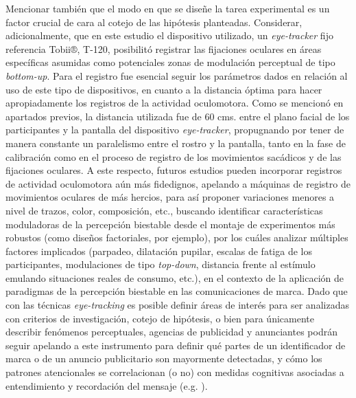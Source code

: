 \documentclass[spanish]{textolivre}
\begin{document}
Mencionar también que el modo en que se diseñe la tarea experimental es un factor crucial de cara al cotejo de las hipótesis planteadas. Considerar, adicionalmente, que en este estudio el dispositivo utilizado, un \textit{eye-tracker} fijo referencia Tobii®, T-120, posibilitó registrar las fijaciones oculares en áreas específicas asumidas como potenciales zonas de modulación perceptual de tipo \textit{bottom-up}. Para el registro fue esencial seguir los parámetros dados en relación al uso de este tipo de dispositivos, en cuanto a la distancia óptima para hacer apropiadamente los registros de la actividad oculomotora. Como se mencionó en apartados previos, la distancia utilizada fue de 60 cms. entre el plano facial de los participantes y la pantalla del dispositivo \textit{eye-tracker}, propugnando por tener de manera constante un paralelismo entre el rostro y la pantalla, tanto en la fase de calibración como en el proceso de registro de los movimientos sacádicos y de las fijaciones oculares. A este respecto, futuros estudios pueden incorporar registros de actividad oculomotora aún más fidedignos, apelando a máquinas de registro de movimientos oculares de más hercios, para así proponer variaciones menores a nivel de trazos, color, composición, etc., buscando identificar características moduladoras de la percepción biestable desde el montaje de experimentos más robustos (como diseños factoriales, por ejemplo), por los cuáles analizar múltiples factores implicados (parpadeo, dilatación pupilar, escalas de fatiga de los participantes, modulaciones de tipo \textit{top-down}, distancia frente al estímulo emulando situaciones reales de consumo, etc.), en el contexto de la aplicación de paradigmas de la percepción biestable en las comunicaciones de marca. Dado que con las técnicas \textit{eye-tracking} es posible definir áreas de interés para ser analizadas con criterios de investigación, cotejo de hipótesis, o bien para únicamente describir fenómenos perceptuales, agencias de publicidad y anunciantes podrán seguir apelando a este instrumento para definir qué partes de un identificador de marca o de un anuncio publicitario son mayormente detectadas, y cómo los patrones atencionales se correlacionan (o no) con medidas cognitivas asociadas a entendimiento y recordación del mensaje (e.g. \textcite{scott_investigation_2016}).
\end{document}
